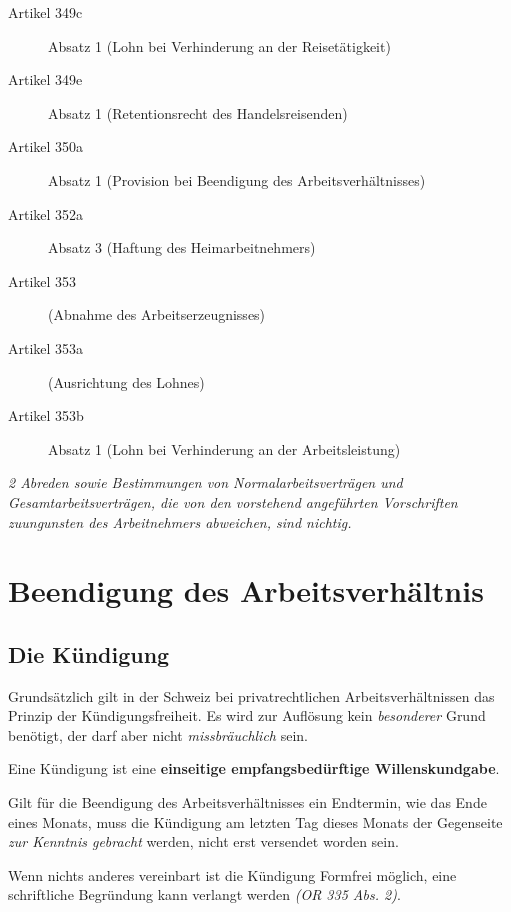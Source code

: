 \begin{description}
    \item[Artikel 349c]
    Absatz 1 (Lohn bei Verhinderung an der Reisetätigkeit)

    \item[Artikel 349e]
    Absatz 1 (Retentionsrecht des Handelsreisenden)

    \item[Artikel 350a]
    Absatz 1 (Provision bei Beendigung des Arbeitsverhältnisses)

    \item[Artikel 352a]
    Absatz 3 (Haftung des Heimarbeitnehmers)

    \item[Artikel 353]
    (Abnahme des Arbeitserzeugnisses)

    \item[Artikel 353a]
    (Ausrichtung des Lohnes)

    \item[Artikel 353b]
    Absatz 1 (Lohn bei Verhinderung an der Arbeitsleistung)
\end{description}

\textit{2 Abreden sowie Bestimmungen von Normalarbeitsverträgen und Gesamtarbeitsverträgen, die von den vorstehend angeführten Vorschriften zuungunsten des Arbeitnehmers abweichen, sind nichtig.}


\section{Beendigung des Arbeitsverhältnis}
\subsection{Die Kündigung}
Grundsätzlich gilt in der Schweiz bei privatrechtlichen Arbeitsverhältnissen das Prinzip der Kündigungsfreiheit. Es wird zur Auflösung kein \textit{besonderer} Grund benötigt, der darf aber nicht \textit{missbräuchlich} sein.

Eine Kündigung ist eine \textbf{einseitige empfangsbedürftige Willenskundgabe}.

Gilt für die Beendigung des Arbeitsverhältnisses ein Endtermin, wie das Ende eines Monats, muss die Kündigung am letzten Tag dieses Monats der Gegenseite \textit{zur Kenntnis gebracht} werden, nicht erst versendet worden sein.

Wenn nichts anderes vereinbart ist die Kündigung Formfrei möglich, eine schriftliche Begründung kann verlangt werden \textit{(OR 335 Abs. 2)}.


